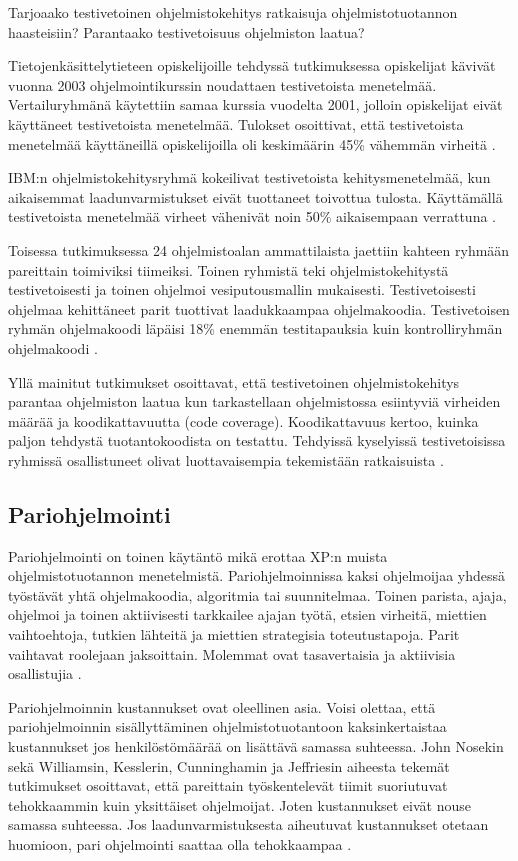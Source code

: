 \documentclass[finnish]{tktltiki2}
\theoremstyle{definition}
\theoremstyle{remark}
\begin{document}
Tarjoaako testivetoinen ohjelmistokehitys ratkaisuja ohjelmistotuotannon haasteisiin? Parantaako testivetoisuus ohjelmiston laatua? 

Tietojen\-käsittely\-tieteen opiskelijoille tehdyssä tutkimuksessa opiskelijat kävivät vuonna 2003 ohjelmointikurssin noudattaen testivetoista menetelmää. Vertailuryhmänä käytettiin samaa kurssia vuodelta 2001, jolloin opiskelijat eivät käyttäneet testivetoista menetelmää. Tulokset osoittivat, että testivetoista menetelmää käyttäneillä opiskelijoilla oli keskimäärin 45\% vähemmän virheitä \cite{EDW03}.

IBM:n ohjelmistokehitysryhmä kokeilivat testivetoista kehitysmenetelmää, kun aikaisemmat laadunvarmistukset eivät tuottaneet toivottua tulosta. Käyttämällä testivetoista menetelmää virheet vähenivät noin 50\% aikaisempaan verrattuna \cite{MAW03}.

Toisessa tutkimuksessa 24 ohjelmistoalan ammattilaista jaettiin kahteen ryhmään pareittain toimiviksi tiimeiksi. Toinen ryhmistä teki ohjelmistokehitystä testivetoisesti ja toinen ohjelmoi vesiputousmallin mukaisesti. Testivetoisesti ohjelmaa kehittäneet parit tuottivat laadukkaampaa ohjelmakoodia. Testivetoisen ryhmän ohjelmakoodi läpäisi 18\% enemmän testitapauksia kuin kontrolliryhmän ohjelmakoodi \cite{GEW03}.

Yllä mainitut tutkimukset osoittavat, että testivetoinen ohjelmistokehitys parantaa ohjelmiston laatua kun tarkastellaan ohjelmistossa esiintyviä virheiden määrää ja koodikattavuutta (code coverage). Koodikattavuus kertoo, kuinka paljon tehdystä tuotantokoodista on testattu. Tehdyissä kyselyissä testivetoisissa ryhmissä osallistuneet olivat luottavaisempia tekemistään ratkaisuista \cite{GEW03}.   

\subsection{Pariohjelmointi}

Pariohjelmointi on toinen käytäntö mikä erottaa XP:n muista ohjelmistotuotannon menetelmistä. Pariohjelmoinnissa kaksi ohjelmoijaa yhdessä työstävät yhtä ohjelmakoodia, algoritmia tai suunnitelmaa. Toinen parista, ajaja, ohjelmoi ja toinen aktiivisesti tarkkailee ajajan työtä, etsien virheitä, miettien vaihtoehtoja, tutkien lähteitä ja miettien strategisia toteutustapoja. Parit vaihtavat roolejaan jaksoittain. Molemmat ovat tasavertaisia ja aktiivisia osallistujia \cite{WIL00}.

Pariohjelmoinnin kustannukset ovat oleellinen asia. Voisi olettaa, että pariohjelmoinnin sisällyttäminen ohjelmistotuotantoon kaksinkertaistaa kustannukset jos henkilöstömäärää on lisättävä samassa suhteessa. John Nosekin \cite{NOS98} sekä Williamsin, Kesslerin, Cunninghamin ja Jeffriesin \cite{WIL00} aiheesta tekemät tutkimukset osoittavat, että pareittain työskentelevät tiimit suoriutuvat tehokkaammin kuin yksittäiset ohjelmoijat. Joten kustannukset eivät nouse samassa suhteessa. Jos laadunvarmistuksesta aiheutuvat kustannukset otetaan huomioon, pari ohjelmointi saattaa olla tehokkaampaa \cite{COC00a}.
\end{document}
